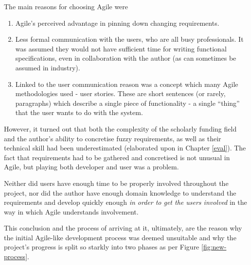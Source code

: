 The main reasons for choosing Agile were
\label{agile-reasons}
\begin{enumerate}
 \item Agile's perceived advantage in pinning down changing requirements.
 \item Less formal communication with the users, who are all busy professionals. It was assumed they would not have sufficient time for writing functional specifications, even in collaboration with the author (as can sometimes be assumed in industry).
 \item Linked to the user communication reason was a concept which many Agile methodologies used - user stories. These are short sentences (or rarely, paragraphs) which describe a single piece of functionality - a single ``thing'' that the user wants to do with the system.
\end{enumerate}

However, it turned out that both the complexity of the scholarly funding field and the author's ability to concretise fuzzy requirements, as well as their technical skill had been underestimated (elaborated upon in Chapter \ref{eval}). The fact that requirements had to be gathered and concretised is not unusual in Agile, but playing both developer and user was a problem. 

Neither did users have enough time to be properly involved throughout the project, nor did the author have enough domain knowledge to understand the requirements and develop quickly enough \emph{in order to get the users involved} in the way in which Agile understands involvement.

This conclusion and the process of arriving at it, ultimately, are the reason why the initial Agile-like development process was deemed unsuitable and why the project's progress is split so starkly into two phases as per Figure \ref{fig:new-process}.

